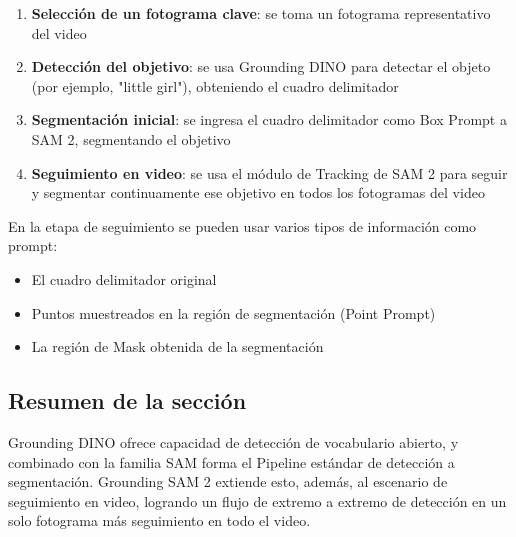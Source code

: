 \begin{enumerate}
    \item \textbf{Selección de un fotograma clave}: se toma un fotograma representativo del video
    \item \textbf{Detección del objetivo}: se usa Grounding DINO para detectar el objeto (por ejemplo, "little girl"), obteniendo el cuadro delimitador
    \item \textbf{Segmentación inicial}: se ingresa el cuadro delimitador como Box Prompt a SAM 2, segmentando el objetivo
    \item \textbf{Seguimiento en video}: se usa el módulo de Tracking de SAM 2 para seguir y segmentar continuamente ese objetivo en todos los fotogramas del video
\end{enumerate}

En la etapa de seguimiento se pueden usar varios tipos de información como prompt:
\begin{itemize}
    \item El cuadro delimitador original
    \item Puntos muestreados en la región de segmentación (Point Prompt)
    \item La región de Mask obtenida de la segmentación
\end{itemize}

\subsection{Resumen de la sección}

Grounding DINO ofrece capacidad de detección de vocabulario abierto, y combinado con la familia SAM forma el Pipeline estándar de detección a segmentación. Grounding SAM 2 extiende esto, además, al escenario de seguimiento en video, logrando un flujo de extremo a extremo de detección en un solo fotograma más seguimiento en todo el video.


